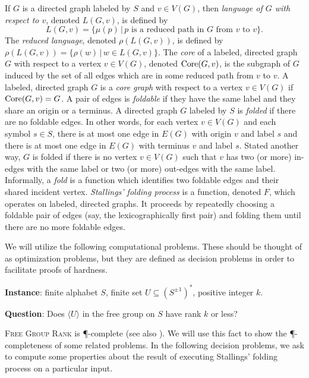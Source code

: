 \documentclass{article}
\newcommand{\FGR}{\textsc{Free Group Rank}}
\newcommand{\gen}[1]{\langle #1 \rangle}
\newcommand{\Core}{\textnormal{Core}}
\newcommand{\Spm}{S^{\pm1}}
\newcommand{\Instance}{\textbf{Instance}: }
\newcommand{\Question}{\textbf{Question}: }
\begin{document}
If $G$ is a directed graph labeled by $S$ and $v \in V(G)$, then \emph{language of $G$ with respect to $v$}, denoted $L(G, v)$, is defined by
\begin{equation*}
  L(G, v) = \{ \mu(p) \, | \, p \text{ is a reduced path in } G \text{ from } v \text{ to } v\}.
\end{equation*}
The \emph{reduced language}, denoted $\rho(L(G, v))$, is defined by $\rho(L(G, v)) = \{ \rho(w) \, | \, w \in L(G, v) \}$.
The \emph{core} of a labeled, directed graph $G$ with respect to a vertex $v \in V(G)$, denoted $\Core(G, v)$, is the subgraph of $G$ induced by the set of all edges which are in some reduced path from $v$ to $v$.
A labeled, directed graph $G$ is a \emph{core graph} with respect to a vertex $v \in V(G)$ if $\Core(G, v) = G$.
A pair of edges is \emph{foldable} if they have the same label and they share an origin or a terminus.
A directed graph $G$ labeled by $S$ is \emph{folded} if there are no foldable edges.
In other words, for each vertex $v \in V(G)$ and each symbol $s \in S$, there is at most one edge in $E(G)$ with origin $v$ and label $s$ and there is at most one edge in $E(G)$ with terminus $v$ and label $s$.
Stated another way, $G$ is folded if there is no vertex $v \in V(G)$ such that $v$ has two (or more) in-edges with the same label or two (or more) out-edges with the same label.
Informally, a \emph{fold} is a function which identifies two foldable edges and their shared incident vertex.
\emph{Stallings' folding process} is a function, denoted $F$, which operates on labeled, directed graphs.
It proceeds by repeatedly choosing a foldable pair of edges (say, the lexicographically first pair) and folding them until there are no more foldable edges.

We will utilize the following computational problems.
These should be thought of as optimization problems, but they are defined as decision problems in order to facilitate proofs of hardness.
\begin{definition}[\FGR]
  \setlength{\parindent}{0pt}
  \mbox{}

  \Instance finite alphabet $S$, finite set $U \subseteq \left(\Spm\right)^*$, positive integer $k$.

  \Question Does $\gen{U}$ in the free group on $S$ have rank $k$ or less?
\end{definition}

\FGR{} is \P-complete \cite[Theorem~4.9]{am84} (see also \cite[Problem~A.8.11]{ghr95}).
We will use this fact to show the \P-completeness of some related problems.
In the following decision problems, we ask to compute some properties about the result of executing Stallings' folding process on a particular input.
\end{document}
